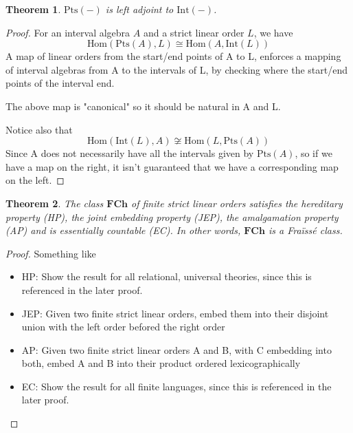 \documentclass[11pt %
              ]{article}
\newcommand{\finslo}{\textbf{FCh}}
\newcommand{\inter}[1][-]{\text{Int}\left(#1\right)}
\newcommand{\points}[1][-]{\text{Pts}\left(#1\right)}
\theoremstyle{plain}
\newtheorem{thm}{Theorem}%
\theoremstyle{definition}
\theoremstyle{remark}
\begin{document}
\begin{thm}
  $\points$ is left adjoint to $\inter$.
\end{thm}
\begin{proof}
  For an interval algebra $A$ and a strict linear order $L$, we have
  \begin{equation*}
    \text{Hom}(\points[A], L) \cong \text{Hom}(A, \inter[L])
  \end{equation*}
  A map of linear orders from the start/end points of A to L, enforces a mapping of interval
  algebras from A to the intervals of L, by checking where the start/end points of the interval end.
 
  The above map is "canonical" so it should be natural in A and L.

  Notice also that
  \begin{equation*}
    \text{Hom}(\inter[L],A) \not\cong \text{Hom}(L, \points[A])
  \end{equation*}
  Since A does not necessarily have all the intervals given by $\points[A]$, so if we have a map on
  the right, it isn't guaranteed that we have a corresponding map on the left.
\end{proof}


\begin{thm}
  The class $\finslo$ of finite strict linear orders satisfies the hereditary property (HP),
  the joint embedding property (JEP), the amalgamation property (AP) and is essentially countable
  (EC). In other words, $\finslo$ is a Fraïssé class.
\end{thm}
\begin{proof}
  Something like
  \begin{itemize}
    \item HP: Show the result for all relational, universal theories, since this is referenced in
      the later proof.
    \item JEP: Given two finite strict linear orders, embed them into their disjoint union with
      the left order befored the right order
    \item AP: Given two finite strict linear orders A and B, with C embedding into both,
      embed A and B into their product ordered lexicographically
    \item EC: Show the result for all finite languages, since this is referenced in the later proof.
  \end{itemize}
\end{proof}
\end{document}
